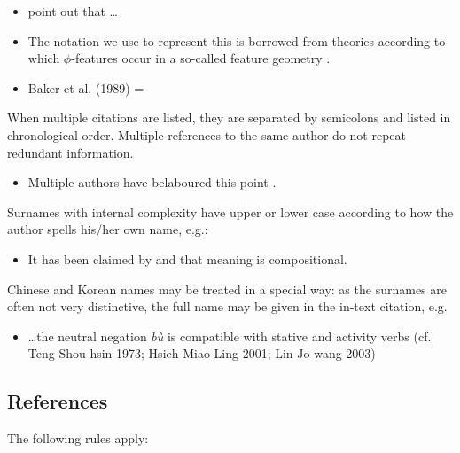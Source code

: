 \documentclass[charis,linguex]{glossa}
\begin{document}
\begin{itemize}
\item \citet[514]{murray:1983} point out that \ldots
\item The notation we use to represent this is borrowed from theories according to which $\phi$-features occur in a so-called feature geometry \citep[248-250]{mccarthy:1999}.
\item Baker et al. (1989) = \citet*{baker:1989}
\end{itemize}
When multiple citations are listed, they are separated by semicolons and listed in chronological order. Multiple references to the same author do not repeat redundant information.

\begin{itemize}
\item Multiple authors have belaboured this point \citep{chomsky:1981,chomsky:1986a,chomsky:1986,iverson:1989,casali:1998a,blevins:2004,franks:2005}.
\end{itemize}
Surnames with internal complexity have upper or lower case according to how the author spells his/her own name, e.g.:

\begin{itemize}
\item It has been claimed by \citet{swart:1998} and \citet{belder:2011} that meaning is compositional.
\end{itemize}
Chinese and Korean names may be treated in a special way: as the surnames are often not very distinctive, the full name may be given in the in-text citation, e.g.

\begin{itemize}
\item  \ldots the neutral negation \textit{bù} is compatible with stative and activity verbs (cf. Teng Shou-hsin 1973; Hsieh Miao-Ling 2001; Lin Jo-wang 2003) %
\end{itemize}

\subsection{References}\label{sec:refs}

The following rules apply:
\end{document}
